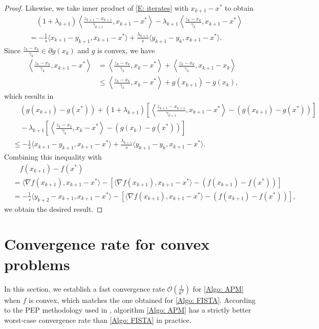 \documentclass[pdflatex,sn-mathphys-num]{sn-jnl}
\theoremstyle{thmstyleone}
\theoremstyle{thmstyletwo}
\theoremstyle{thmstylethree}
\begin{document}
\begin{proof}
Likewise, we take inner product of \eqref{E: iterates} with $x_{k+1}-x^*$ to obtain
\begin{align*}
&\quad (1+\lambda_{k+1}) \left\langle \frac{z_{k+1} - x_{k+1}}{\gamma_{k+1}}, x_{k+1}-x^*\right\rangle
  -\lambda_{k+1} \left\langle \frac{z_k-x_k}{\gamma_k}, x_{k+1}-x^*\right\rangle \\
&= - \frac{1}{s} \langle x_{k+1}-y_{k+1}, x_{k+1}-x^* \rangle + \frac{\lambda_{k+1}}{s} \langle y_{k+1}-y_k, x_{k+1} - x^* \rangle.
\end{align*}
Since $ \frac{z_k-x_k}{\gamma_k} \in \partial g(x_k)$ and $g$ is convex, we have
\begin{align*}
\left\langle \frac{z_k-x_k}{\gamma_k}, x_{k+1}-x^*\right\rangle
&= \left\langle \frac{z_k-x_k}{\gamma_k}, x_k-x^*\right\rangle
  + \left\langle \frac{z_k-x_k}{\gamma_k}, x_{k+1}-x_k\right\rangle\\
&\le \left\langle \frac{z_k-x_k}{\gamma_k}, x_k - x^* \right\rangle  + g(x_{k+1}) - g(x_k),
\end{align*}
which results in
\begin{align*}
&\quad \left(g(x_{k+1}) - g(x^*)\right)
  + (1+\lambda_{k+1})\left[ \left\langle \frac{z_{k+1}-x_{k+1}}{\gamma_{k+1}}, x_{k+1} - x^* \right\rangle - \left( g(x_{k+1}) - g(x^*) \right) \right]\\
&\quad -\lambda_{k+1} \left[ \left\langle \frac{z_k-x_k}{\gamma_k}, x_k - x^* \right\rangle - \left( g(x_k) - g(x^*) \right) \right] \\ 
&\le - \frac{1}{s} \langle x_{k+1}-y_{k+1}, x_{k+1}-x^* \rangle + \frac{\lambda_{k+1}}{s} \langle y_{k+1}-y_k, x_{k+1} - x^* \rangle.
\end{align*}
Combining this inequality with
\begin{align*}
&\quad f(x_{k+1}) - f(x^*) \\ 
&= \langle \nabla f(x_{k+1}), x_{k+1} - x^* \rangle - \left[ \langle \nabla f(x_{k+1}), x_{k+1} - x^* \rangle - \left( f(x_{k+1}) - f(x^*) \right) \right] \\
&= -\frac{1}{s}\langle y_{k+2}-x_{k+1}, x_{k+1} - x^* \rangle - \left[ \langle \nabla f(x_{k+1}), x_{k+1} - x^* \rangle - \left( f(x_{k+1}) - f(x^*) \right) \right],   
\end{align*}
we obtain the desired result.
\end{proof}




\section{Convergence rate for convex problems}\label{Sec: convexity}
In this section, we establish a fast convergence rate $\mathcal{O}\left( \frac{1}{k^2} \right)$ for \eqref{Algo: APM} when $f$ is convex, which matches the one obtained for \eqref{Algo: FISTA}. According to the PEP methodology used in \cite{Taylor_2017}, algorithm \eqref{Algo: APM} has a strictly better worst-case convergence rate than \eqref{Algo: FISTA} in practice.
\end{document}
